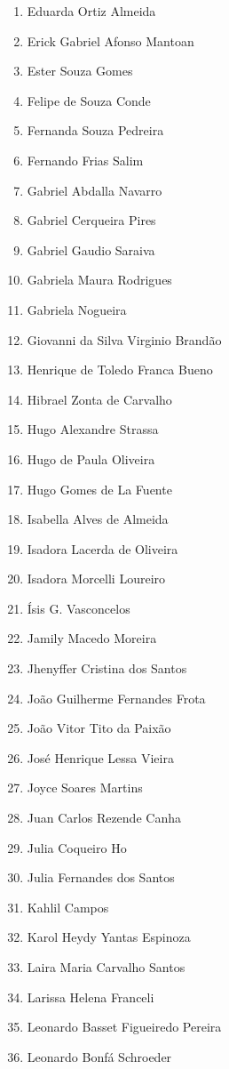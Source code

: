 \documentclass[
  letterpaper,
  DIV=11,
  numbers=noendperiod]{scrreprt}
\begin{document}
\begin{enumerate}
\item
  Eduarda Ortiz Almeida
\item
  Erick Gabriel Afonso Mantoan
\item
  Ester Souza Gomes
\item
  Felipe de Souza Conde
\item
  Fernanda Souza Pedreira
\item
  Fernando Frias Salim
\item
  Gabriel Abdalla Navarro
\item
  Gabriel Cerqueira Pires
\item
  Gabriel Gaudio Saraiva
\item
  Gabriela Maura Rodrigues
\item
  Gabriela Nogueira
\item
  Giovanni da Silva Virginio Brandão
\item
  Henrique de Toledo Franca Bueno
\item
  Hibrael Zonta de Carvalho
\item
  Hugo Alexandre Strassa
\item
  Hugo de Paula Oliveira
\item
  Hugo Gomes de La Fuente
\item
  Isabella Alves de Almeida
\item
  Isadora Lacerda de Oliveira
\item
  Isadora Morcelli Loureiro
\item
  Ísis G. Vasconcelos
\item
  Jamily Macedo Moreira
\item
  Jhenyffer Cristina dos Santos
\item
  João Guilherme Fernandes Frota
\item
  João Vitor Tito da Paixão
\item
  José Henrique Lessa Vieira
\item
  Joyce Soares Martins
\item
  Juan Carlos Rezende Canha
\item
  Julia Coqueiro Ho
\item
  Julia Fernandes dos Santos
\item
  Kahlil Campos
\item
  ⁠Karol Heydy Yantas Espinoza
\item
  Laira Maria Carvalho Santos
\item
  Larissa Helena Franceli
\item
  Leonardo Basset Figueiredo Pereira
\item
  Leonardo Bonfá Schroeder

\end{enumerate}
\end{document}

